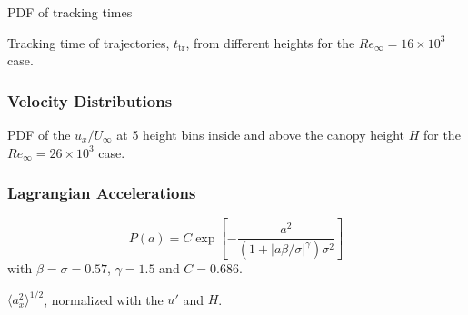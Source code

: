 \documentclass[aspectratio=43]{beamer}
\begin{document}
\begin{frame}{PDF of tracking times}
\centering {}
\begin{cardTiny} Tracking time of trajectories, $t_\text{tr}$, from different heights for the  $Re_\infty=16\times10^3$ case. \end{cardTiny} 
\end{frame}


\subsubsection*{Velocity Distributions}
\begin{frame}
	\centering
	\vspace{-.3cm}
	\begin{cardTiny} PDF of the $u_x/U_\infty$ at 5 height bins inside and above the canopy height $H$ for the $Re_\infty = 26\times 10^3$ case. 
	\end{cardTiny}
\end{frame}


\subsubsection*{Lagrangian Accelerations}

\begin{frame}
\centering{}
\begin{cardTiny} %
\begin{equation}
P(a) = C \exp \left[- \frac{a^2}{\left( 1 + |a\beta / \sigma|^\gamma   \right) \sigma^2} \right]
\label{eq:stretched_exp}
\end{equation}
with $\beta=\sigma=0.57$, $\gamma=1.5$ and $C = 0.686$. 
\end{cardTiny}
\end{frame}


\begin{frame}
\centering{}
\begin{cardTiny} $\langle a_x^2 \rangle^{1/2}$, normalized with the $u'$ and $H$.\end{cardTiny}
%
\end{frame}


\end{document}
